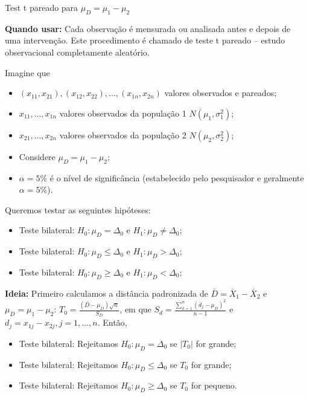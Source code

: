 \documentclass[9pt]{beamer}
\begin{document}
\begin{frame}{Test t pareado para $\mu_D = \mu_1 - \mu_2$}

\footnotesize
	\textbf{Quando usar:} Cada observação é mensurada ou analisada antes e depois de uma intervenção. Este procedimento é chamado de teste t pareado -- \textcolor{important}{estudo observacional completamente aleatório}.
	
	Imagine que 
	\begin{itemize}
		\item $(x_{11}, x_{21}), (x_{12}, x_{22}), \dots, (x_{1n}, x_{2n})$ valores observados e pareados;
		\item $x_{11}, \dots, x_{1n}$ valores observados da população 1 $N(\mu_1, \sigma_1^2)$;
		\item $x_{21}, \dots, x_{2n}$ valores observados da população 2 $N(\mu_2, \sigma_2^2)$;
		\item Considere $\mu_D = \mu_1 - \mu_2$;
		\item $\alpha=5\%$ é o nível de significância (estabelecido pelo pesquisador e geralmente $\alpha=5\%$).
	\end{itemize}
	\vfill

	Queremos testar as seguintes hipóteses:
	\begin{itemize}
		\item Teste bilateral: $H_0: \mu_D = \Delta_0$ e $H_1: \mu_D \neq \Delta_0$;
		\item Teste bilateral: $H_0: \mu_D \leq \Delta_0$ e $H_1: \mu_D > \Delta_0$;
		\item Teste bilateral: $H_0: \mu_D \geq \Delta_0$ e $H_1: \mu_D < \Delta_0$;
	\end{itemize}
	\vfill

	\textbf{Ideia:} Primeiro calculamos a distância padronizada de $\bar{D} =\bar{X}_1 - \bar{X}_2$ e $\mu_D = \mu_1 - \mu_2$: $T_0 = \frac{(\bar{D} - \mu_D)\sqrt{n}}{S_D}$, em que $S_d = \frac{\sum_{k=1}^{n} (d_j - \mu_D)^2  }{n-1}$ e $d_j = x_{1j} - x_{2j}, j=1, \dots, n$. Então,
	\begin{itemize}
		\item Teste bilateral: Rejeitamos $H_0: \mu_D = \Delta_0$ se $\lvert T_0 \rvert$ for grande;
		\item Teste bilateral: Rejeitamos $H_0: \mu_D \leq \Delta_0$ se $ T_0 $ for grande;
		\item Teste bilateral: Rejeitamos $H_0: \mu_D \geq \Delta_0$ se $ T_0 $ for pequeno.
	\end{itemize}
\normalsize
\end{frame}
\end{document}
